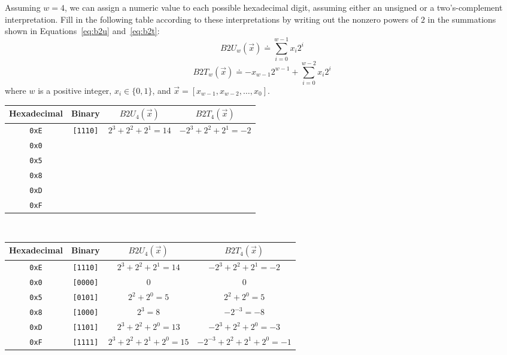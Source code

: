 \documentclass[12pt]{article}
\newenvironment{ex}[2][Exercise]{\begin{trivlist}
		\item[\hskip \labelsep {\bfseries #1}\hskip \labelsep {\bfseries #2.}]}{\end{trivlist}}
\newenvironment{sol}[1][Solution]{\begin{trivlist}
		\item[\hskip \labelsep {\bfseries #1:}]}{\end{trivlist}}
\begin{document}
\begin{ex}{2.17}
	Assuming $w=4$, we can assign a numeric value to each possible hexadecimal digit,
	assuming either an unsigned or a two's-complement interpretation. Fill in the following
	table according to these interpretations by writing out the nonzero powers of $2$
	in the summations shown in Equations~\ref{eq:b2u} and~\ref{eq:b2t}:
	\begin{equation}\label{eq:b2u}
		B2U_w(\vec{x})\doteq\sum_{i=0}^{w-1}x_i2^i
	\end{equation}
	\begin{equation}\label{eq:b2t}
		B2T_w(\vec{x})\doteq-x_{w-1}2^{w-1}+\sum_{i=0}^{w-2}x_i2^i
	\end{equation}
	where $w$ is a positive integer, $x_i\in\{0,1\}$, and $\vec{x}=[x_{w-1},x_{w-2},\ldots,x_0]$.
	\begin{center}
		\begin{tabular}{cccc}
			Hexadecimal & Binary & $B2U_4(\vec{x})$ & $B2T_4(\vec{x})$ \\
			\hline
			\texttt{0xE} & \texttt{[1110]} & $2^3+2^2+2^1=14$ & $-2^3+2^2+2^1=-2$\\
			\texttt{0x0} & \makebox[1cm]{\hrulefill} & \makebox[1cm]{\hrulefill} & \makebox[1cm]{\hrulefill}\\
			\texttt{0x5} & \makebox[1cm]{\hrulefill} & \makebox[1cm]{\hrulefill} & \makebox[1cm]{\hrulefill}\\
			\texttt{0x8} & \makebox[1cm]{\hrulefill} & \makebox[1cm]{\hrulefill} & \makebox[1cm]{\hrulefill}\\
			\texttt{0xD} & \makebox[1cm]{\hrulefill} & \makebox[1cm]{\hrulefill} & \makebox[1cm]{\hrulefill}\\
			\texttt{0xF} & \makebox[1cm]{\hrulefill} & \makebox[1cm]{\hrulefill} & \makebox[1cm]{\hrulefill}
		\end{tabular}
	\end{center}
\end{ex}

\begin{sol}
	\
	\begin{center}
		\begin{tabular}{cccc}
			Hexadecimal & Binary & $B2U_4(\vec{x})$ & $B2T_4(\vec{x})$ \\
			\hline
			\texttt{0xE} & \texttt{[1110]} & $2^3+2^2+2^1=14$ & $-2^3+2^2+2^1=-2$\\
			\texttt{0x0} & \texttt{[0000]} & $0$ & $0$\\
			\texttt{0x5} & \texttt{[0101]} & $2^2+2^0=5$ & $2^2+2^0=5$\\
			\texttt{0x8} & \texttt{[1000]} & $2^3=8$ & $-2^{-3}=-8$\\
			\texttt{0xD} & \texttt{[1101]} & $2^3+2^2+2^0=13$ & $-2^3+2^2+2^0=-3$\\
			\texttt{0xF} & \texttt{[1111]} & $2^3+2^2+2^1+2^0=15$ & $-2^{-3}+2^2+2^1+2^0=-1$
		\end{tabular}
	\end{center}
\end{sol}
\end{document}
